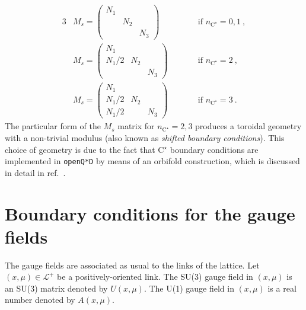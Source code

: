 \documentclass[11pt,fleqn]{article}
\begin{document}
\begin{alignat}{3}
   & M_s =
   \begin{pmatrix}
      N_1 & & \\
      & N_2 & \\
      & & N_3
   \end{pmatrix}
   & \qquad & \text{if } n_{\text{C}^\star}=0,1 \ ,
   \\
   & M_s =
   \begin{pmatrix}
      N_1 & & \\
      N_1/2 & N_2 & \\
      & & N_3
   \end{pmatrix}
   & \qquad & \text{if } n_{\text{C}^\star}=2 \ ,
   \\
   & M_s =
   \begin{pmatrix}
      N_1 & & \\
      N_1/2 & N_2 & \\
      N_1/2 & & N_3
   \end{pmatrix}
   & \qquad & \text{if } n_{\text{C}^\star}=3 \ .
\end{alignat}
The particular form of the $M_s$ matrix for $n_{\text{C}^\star}=2,3$ produces a toroidal geometry with a non-trivial modulus (also known as \textit{shifted boundary conditions}). This choice of geometry is due to the fact that C$^\star$ boundary conditions are implemented in \texttt{openQ*D} by means of an orbifold construction, which is discussed in detail in ref.~\cite{cstar}.


\section{Boundary conditions for the gauge fields}
\label{sec:gaugefield}

The gauge fields are associated as usual to the links of the lattice. Let $(x,\mu) \in \mathcal{L}^+$ be a positively-oriented link. The SU(3) gauge field in $(x,\mu)$ is an SU(3) matrix denoted by $U(x,\mu)$. The U(1) gauge field in $(x,\mu)$ is a real number denoted by $A(x,\mu)$.
\end{document}
